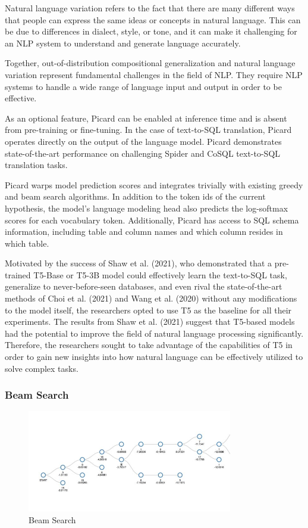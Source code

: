 Natural language variation refers to the fact that there are many different ways that people can express the same ideas or concepts in natural language. This can be due to differences in dialect, style, or tone, and it can make it challenging for an NLP system to understand and generate language accurately.

Together, out-of-distribution compositional generalization and natural language variation represent fundamental challenges in the field of NLP. They require NLP systems to handle a wide range of language input and output in order to be effective.

As an optional feature, Picard can be enabled at inference time and is absent from pre-training or fine-tuning. In the case of text-to-SQL translation, Picard operates directly on the output of the language model.
Picard demonstrates state-of-the-art performance on challenging Spider and CoSQL text-to-SQL translation tasks.

Picard warps model prediction scores and integrates trivially with existing greedy and beam search algorithms. In addition to the token ids of the current hypothesis, the model's language modeling head also predicts the log-softmax scores for each vocabulary token. Additionally, Picard has access to SQL schema information, including table and column names and which column resides in which table.

Motivated by the success of Shaw et al. (2021), who demonstrated that a pre-trained T5-Base or T5-3B model could effectively learn the text-to-SQL task, generalize to never-before-seen databases, and even rival the state-of-the-art methods of Choi et al. (2021) and Wang et al. (2020) without any modifications to the model itself, the researchers opted to use T5 as the baseline for all their experiments. The results from Shaw et al. (2021) suggest that T5-based models had the potential to improve the field of natural language processing significantly. Therefore, the researchers sought to take advantage of the capabilities of T5 in order to gain new insights into how natural language can be effectively utilized to solve complex tasks.

\subsubsection*{Beam Search}

\begin{figure}[h]
    \centering
    \includegraphics[width=0.8\textwidth]{pics/picard/beam.png}
    \caption{Beam Search}
    \label{fig:beam_search}
\end{figure}

